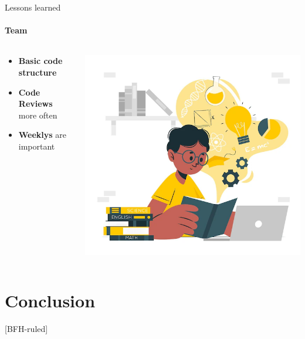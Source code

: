 \documentclass[
ngerman,%
authorontitle=true,
]{bfhbeamer}
\begin{document}
	\begin{frame}{Lessons learned}
		\framesubtitle{Team}
		\begin{columns} %
			\begin{column}{0.5\textwidth} %
				\begin{itemize}
					\item \textbf{Basic code structure}
					\item \textbf{Code Reviews} more often 
					\item \textbf{Weeklys} are important
				\end{itemize}
			\end{column}
			\begin{column}{0.3\textwidth} %
				\begin{center}
					\includegraphics[width=1\textwidth]{pictures/Learnings}
				\end{center}
			\end{column}
		\end{columns}
	\end{frame}
	
	\section{Conclusion}
	[BFH-ruled]
	\frame{\sectionpage}
	
\end{document}
